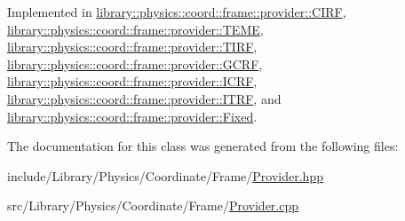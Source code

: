 Implemented in \hyperlink{classlibrary_1_1physics_1_1coord_1_1frame_1_1provider_1_1_c_i_r_f_ab5676de1c31ad796d56a684615fabdf8}{library\+::physics\+::coord\+::frame\+::provider\+::\+C\+I\+RF}, \hyperlink{classlibrary_1_1physics_1_1coord_1_1frame_1_1provider_1_1_t_e_m_e_a8c52ea8c59a669197234383e4bfa54b6}{library\+::physics\+::coord\+::frame\+::provider\+::\+T\+E\+ME}, \hyperlink{classlibrary_1_1physics_1_1coord_1_1frame_1_1provider_1_1_t_i_r_f_a3656639fda8a7b991335752559d7594b}{library\+::physics\+::coord\+::frame\+::provider\+::\+T\+I\+RF}, \hyperlink{classlibrary_1_1physics_1_1coord_1_1frame_1_1provider_1_1_g_c_r_f_a0e6155c096ff1c231b14e59544fe038c}{library\+::physics\+::coord\+::frame\+::provider\+::\+G\+C\+RF}, \hyperlink{classlibrary_1_1physics_1_1coord_1_1frame_1_1provider_1_1_i_c_r_f_a533e5d0240150b5c23080ee8bf89d040}{library\+::physics\+::coord\+::frame\+::provider\+::\+I\+C\+RF}, \hyperlink{classlibrary_1_1physics_1_1coord_1_1frame_1_1provider_1_1_i_t_r_f_a10a6a129ab5410f3ad3d687f73ba6d8e}{library\+::physics\+::coord\+::frame\+::provider\+::\+I\+T\+RF}, and \hyperlink{classlibrary_1_1physics_1_1coord_1_1frame_1_1provider_1_1_fixed_ac7a58fa0937c28ed0289c1088275c3d2}{library\+::physics\+::coord\+::frame\+::provider\+::\+Fixed}.



The documentation for this class was generated from the following files\+:\begin{DoxyCompactItemize}
\item 
include/\+Library/\+Physics/\+Coordinate/\+Frame/\hyperlink{_provider_8hpp}{Provider.\+hpp}\item 
src/\+Library/\+Physics/\+Coordinate/\+Frame/\hyperlink{_provider_8cpp}{Provider.\+cpp}\end{DoxyCompactItemize}
